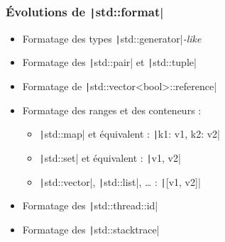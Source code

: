 \documentclass[C++.tex]{subfiles}
\begin{document}
\begin{frame}[fragile]
	\frametitle{Évolutions de \texttt|std::format|}
	\begin{itemize}
		\item Formatage des types \texttt|std::generator|\textit{-like}
		\item Formatage des \texttt|std::pair| et \texttt|std::tuple|
		\item Formatage de \texttt|std::vector<bool>::reference|
		\item Formatage des ranges et des conteneurs :
		\begin{itemize}
			\item \texttt|std::map| et équivalent : \texttt|{k1: v1, k2: v2}|
			\item \texttt|std::set| et équivalent : \texttt|{v1, v2}|
			\item \texttt|std::vector|, \texttt|std::list|, \ldots{} : \texttt|[v1, v2]|
		\end{itemize}
		\item Formatage des \texttt|std::thread::id|
		\item Formatage des \texttt|std::stacktrace|
	\end{itemize}



\end{frame}
\end{document}
